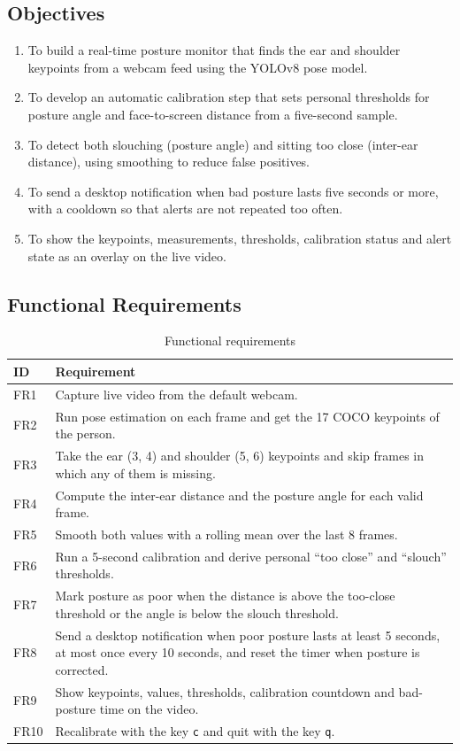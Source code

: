 ﻿\documentclass[12pt,a4paper]{article}
\begin{document}
\subsection{Objectives}
\begin{enumerate}[label=\textbf{\arabic*.}]
    \item To build a real-time posture monitor that finds the ear and shoulder keypoints
          from a webcam feed using the YOLOv8 pose model.
    \item To develop an automatic calibration step that sets personal thresholds for
          posture angle and face-to-screen distance from a five-second sample.
    \item To detect both slouching (posture angle) and sitting too close (inter-ear
          distance), using smoothing to reduce false positives.
    \item To send a desktop notification when bad posture lasts five seconds or more, with
          a cooldown so that alerts are not repeated too often.
    \item To show the keypoints, measurements, thresholds, calibration status and alert
          state as an overlay on the live video.
\end{enumerate}

\subsection{Functional Requirements}
\begin{table}[H]
\centering
\caption{Functional requirements}\label{tab:fr}
\renewcommand{\arraystretch}{1.25}
\begin{tabularx}{\textwidth}{@{}lY@{}}
\toprule
\textbf{ID} & \textbf{Requirement}\\
\midrule
FR1 & Capture live video from the default webcam.\\
FR2 & Run pose estimation on each frame and get the 17 COCO keypoints of the person.\\
FR3 & Take the ear (3, 4) and shoulder (5, 6) keypoints and skip frames in which any of them is missing.\\
FR4 & Compute the inter-ear distance and the posture angle for each valid frame.\\
FR5 & Smooth both values with a rolling mean over the last 8 frames.\\
FR6 & Run a 5-second calibration and derive personal ``too close'' and ``slouch'' thresholds.\\
FR7 & Mark posture as poor when the distance is above the too-close threshold or the angle is below the slouch threshold.\\
FR8 & Send a desktop notification when poor posture lasts at least 5 seconds, at most once every 10 seconds, and reset the timer when posture is corrected.\\
FR9 & Show keypoints, values, thresholds, calibration countdown and bad-posture time on the video.\\
FR10 & Recalibrate with the key \texttt{c} and quit with the key \texttt{q}.\\
\bottomrule
\end{tabularx}
\end{table}
\end{document}
